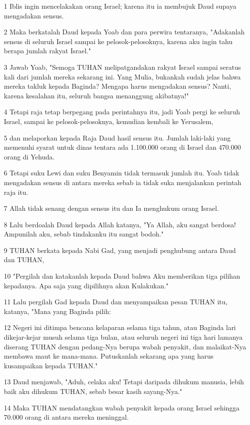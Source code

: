 \par 1 Iblis ingin mencelakakan orang Israel; karena itu ia membujuk Daud supaya mengadakan sensus.
\par 2 Maka berkatalah Daud kepada Yoab dan para perwira tentaranya, "Adakanlah sensus di seluruh Israel sampai ke pelosok-pelosoknya, karena aku ingin tahu berapa jumlah rakyat Israel."
\par 3 Jawab Yoab, "Semoga TUHAN melipatgandakan rakyat Israel sampai seratus kali dari jumlah mereka sekarang ini. Yang Mulia, bukankah sudah jelas bahwa mereka takluk kepada Baginda? Mengapa harus mengadakan sensus? Nanti, karena kesalahan itu, seluruh bangsa menanggung akibatnya!"
\par 4 Tetapi raja tetap berpegang pada perintahnya itu, jadi Yoab pergi ke seluruh Israel, sampai ke pelosok-pelosoknya, kemudian kembali ke Yerusalem,
\par 5 dan melaporkan kepada Raja Daud hasil sensus itu. Jumlah laki-laki yang memenuhi syarat untuk dinas tentara ada 1.100.000 orang di Israel dan 470.000 orang di Yehuda.
\par 6 Tetapi suku Lewi dan suku Benyamin tidak termasuk jumlah itu. Yoab tidak mengadakan sensus di antara mereka sebab ia tidak suka menjalankan perintah raja itu.
\par 7 Allah tidak senang dengan sensus itu dan Ia menghukum orang Israel.
\par 8 Lalu berdoalah Daud kepada Allah katanya, "Ya Allah, aku sangat berdosa! Ampunilah aku, sebab tindakanku itu sangat bodoh."
\par 9 TUHAN berkata kepada Nabi Gad, yang menjadi penghubung antara Daud dan TUHAN,
\par 10 "Pergilah dan katakanlah kepada Daud bahwa Aku memberikan tiga pilihan kepadanya. Apa saja yang dipilihnya akan Kulakukan."
\par 11 Lalu pergilah Gad kepada Daud dan menyampaikan pesan TUHAN itu, katanya, "Mana yang Baginda pilih:
\par 12 Negeri ini ditimpa bencana kelaparan selama tiga tahun, atau Baginda lari dikejar-kejar musuh selama tiga bulan, atau seluruh negeri ini tiga hari lamanya diserang TUHAN dengan pedang-Nya berupa wabah penyakit, dan malaikat-Nya membawa maut ke mana-mana. Putuskanlah sekarang apa yang harus kusampaikan kepada TUHAN."
\par 13 Daud menjawab, "Aduh, celaka aku! Tetapi daripada dihukum manusia, lebih baik aku dihukum TUHAN, sebab besar kasih sayang-Nya."
\par 14 Maka TUHAN mendatangkan wabah penyakit kepada orang Israel sehingga 70.000 orang di antara mereka meninggal.
